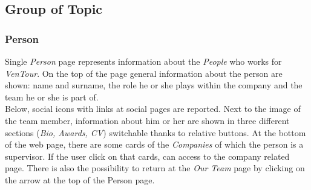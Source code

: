 \documentclass[../../DD.tex]{subfiles}
\begin{document}
\newpage
\subsection{Group of Topic \label{sect:2.1}}

  \subsubsection{Person}
      Single \textit{Person} page represents information about the \textit{People} who works for \textit{VenTour}. 
      On the top of the page general information about the person are shown: name and surname, the role he or she plays within the company and the team he or she is part of.\\
      Below, social icons with links at social pages are reported.
      Next to the image of the team member, information about him or her are shown in three different sections (\textit{Bio, Awards, CV}) switchable thanks to relative buttons.
      At the bottom of the web page, there are some cards of the \textit{Companies} of which the person is a supervisor. If the user click on that cards, can access to the company related page.
      There is also the possibility to return at the \textit{Our Team} page by clicking on the arrow at the top of the Person page.
\end{document}
